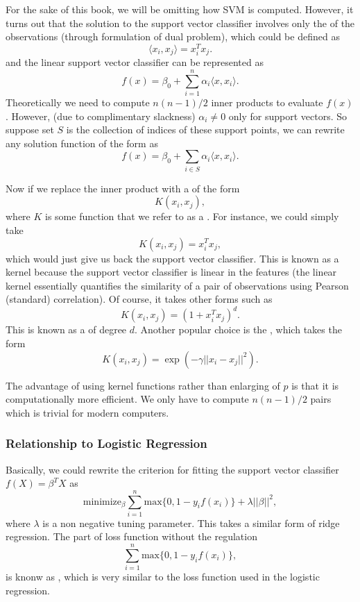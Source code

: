 For the sake of this book, we will be omitting how SVM is computed. However, it turns out that the solution to the support vector classifier involves only the  of the observations (through formulation of dual problem), which could be defined as $$ \langle x_i, x_j \rangle = x_i^Tx_j.$$ and the linear support vector classifier can be represented as $$ f(x) = \beta_0 + \sum_{i=1}^{n}\alpha_i\langle x, x_i \rangle.$$ Theoretically we need to compute $n(n-1)/2$ inner products to evaluate $f(x)$. However, (due to complimentary slackness) $\alpha_i \neq 0$ only for support vectors. So suppose set $S$ is the collection of indices of these support points, we can rewrite any solution function of the form as $$f(x) = \beta_0 + \sum_{i\in S}\alpha_i\langle x, x_i \rangle.$$

Now if we replace the inner product with a  of the form $$ K(x_i, x_j),$$ where $K$ is some function that we refer to as  a . For instance, we could simply take $$ K(x_i, x_j) = x_i^T x_j,$$ which would just give us back the support vector classifier. This is known as a  kernel because the support vector classifier is linear in the features (the linear kernel essentially quantifies the similarity of a
pair of observations using Pearson (standard) correlation). Of course, it takes other forms such as $$ K(x_i, x_j) = (1 + x_i^Tx_j)^d.$$ This is known as a  of degree $d$. Another popular choice is the , which takes the form $$ K(x_i, x_j) = \exp(-\gamma||x_i - x_j||^2).$$

The advantage of using kernel functions rather than enlarging of $p$ is that it is computationally more efficient. We only have to compute $n(n-1)/2$ pairs which is trivial for modern computers.
\subsubsection{Relationship to Logistic Regression}
Basically, we could rewrite the criterion for fitting the support vector classifier $f(X) = \beta^TX$ as $$ \text{minimize}_\beta \sum_{i=1}^n \text{max}\{0, 1-y_if(x_i)\} + \lambda ||\beta||^2,$$ where $\lambda$ is a non negative tuning parameter. This takes a similar form of ridge regression. The part of loss function without the regulation $$\sum_{i=1}^n \text{max}\{0, 1-y_if(x_i)\},$$ is knonw as , which is very similar to the loss function used in the logistic regression.